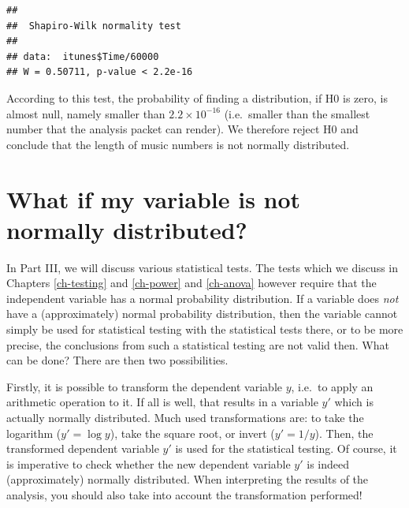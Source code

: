 \documentclass[
]{book}
\newenvironment{Shaded}{\begin{snugshade}}{\end{snugshade}}
\newcommand{\DecValTok}[1]{\textcolor[rgb]{0.00,0.00,0.81}{#1}}
\newcommand{\FunctionTok}[1]{\textcolor[rgb]{0.13,0.29,0.53}{\textbf{#1}}}
\newcommand{\NormalTok}[1]{#1}
\newcommand{\SpecialCharTok}[1]{\textcolor[rgb]{0.81,0.36,0.00}{\textbf{#1}}}
\begin{document}
\begin{Shaded}
\end{Shaded}

\begin{verbatim}
## 
##  Shapiro-Wilk normality test
## 
## data:  itunes$Time/60000
## W = 0.50711, p-value < 2.2e-16
\end{verbatim}

According to this test, the probability of finding a distribution, if H0 is
zero, is almost null, namely smaller than \(2.2 \times 10^{-16}\) (i.e.~smaller than
the smallest number that the analysis packet can render). We therefore
reject H0 and conclude that the length of music numbers is not normally
distributed.

\hypertarget{sec:whatifnotnormal}{%
\section{What if my variable is not normally distributed?}\label{sec:whatifnotnormal}}

In Part III, we will discuss various statistical tests.
The tests which we discuss in Chapters \ref{ch-testing} and \ref{ch-power} and
\ref{ch-anova} however require that the independent
variable has a normal probability distribution. If a variable does \emph{not} have
a (approximately) normal probability distribution, then the variable cannot
simply be used for statistical testing with the statistical tests
there, or to be more precise, the conclusions from such a statistical testing
are not valid then. What can be done? There are then two
possibilities.

Firstly, it is possible to transform the dependent variable \(y\),
i.e.~to apply an arithmetic operation to it. If all is well, that results
in a variable \(y'\) which is actually normally distributed. Much used transformations are: to take the logarithm (\(y'=\log{y}\)), take the square root, or
invert (\(y'=1/y\)). Then, the transformed dependent variable \(y'\) is used for
the statistical testing. Of course, it is imperative to check whether the
new dependent variable \(y'\) is indeed (approximately) normally distributed. When
interpreting the results of the analysis, you should also take into account
the transformation performed!
\end{document}
